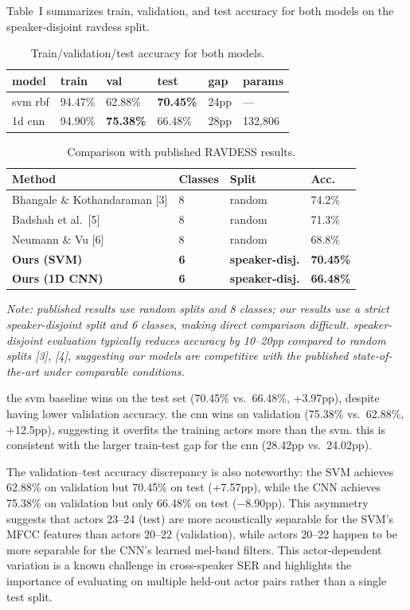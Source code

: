 \documentclass[conference]{IEEEtran}
\begin{document}
{Table~I summarizes train, validation, and test accuracy for both models
on the speaker-disjoint ravdess split.

\begin{table}[H]
\centering
\caption{Train/validation/test accuracy for both models.}
\label{tab:accuracy-comparison}
\begin{tabular}{@{}llllll@{}}
\toprule
model & train & val & test & gap & params \\
\midrule
svm rbf & 94.47\% & 62.88\% & \textbf{70.45\%} & 24pp & --- \\
1d cnn & 94.90\% & \textbf{75.38\%} & 66.48\% & 28pp & 132,806 \\
\bottomrule
\end{tabular}
\end{table}
\begin{table}[H]
\centering
\caption{Comparison with published RAVDESS results.}
\label{tab:literature}
\begin{tabular}{@{}llll@{}}
\toprule
Method & Classes & Split & Acc. \\
\midrule
Bhangale \& Kothandaraman [3] & 8 & random & 74.2\% \\
Badshah et al.\ [5] & 8 & random & 71.3\% \\
Neumann \& Vu [6] & 8 & random & 68.8\% \\
\textbf{Ours (SVM)} & \textbf{6} & \textbf{speaker-disj.} & \textbf{70.45\%} \\
\textbf{Ours (1D CNN)} & \textbf{6} & \textbf{speaker-disj.} & \textbf{66.48\%} \\
\bottomrule
\end{tabular}
\end{table}

\noindent\textit{Note: published results use random splits and 8 classes; 
our results use a strict speaker-disjoint split and 6 classes, 
making direct comparison difficult. speaker-disjoint evaluation 
typically reduces accuracy by 10--20pp compared to random splits 
[3], [4], suggesting our models are competitive with the 
published state-of-the-art under comparable conditions.}

the svm baseline wins on the test set (70.45\% vs.~66.48\%, +3.97pp),
despite having lower validation accuracy. the cnn wins on validation
(75.38\% vs.~62.88\%, +12.5pp), suggesting it overfits the training
actors more than the svm. this is consistent with the larger train-test
gap for the cnn (28.42pp vs.~24.02pp).

\noindent The validation--test accuracy discrepancy is also 
noteworthy: the SVM achieves 62.88\% on validation but 
70.45\% on test (+7.57pp), while the CNN achieves 75.38\% 
on validation but only 66.48\% on test ($-$8.90pp). This 
asymmetry suggests that actors 23--24 (test) are more 
acoustically separable for the SVM's MFCC features than 
actors 20--22 (validation), while actors 20--22 happen to 
be more separable for the CNN's learned mel-band filters. 
This actor-dependent variation is a known challenge in 
cross-speaker SER and highlights the importance of 
evaluating on multiple held-out actor pairs rather than 
a single test split.

}
\end{document}
